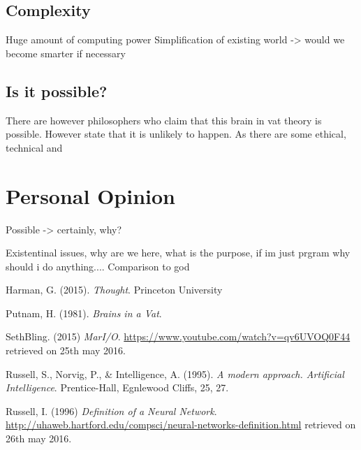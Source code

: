 \documentclass[a4paper]{article}
\begin{document}
\subsection{Complexity}
Huge amount of computing power
Simplification of existing world -> would we become smarter if necessary

\subsection{Is it possible?}
There are however philosophers who claim that this brain in vat theory is possible. However state that it is unlikely to happen. As there are some ethical, technical and 

\section{Personal Opinion}
Possible -> certainly, why?

Existentinal issues, why are we here, what is the purpose, if im just prgram why should i do anything....
Comparison to god

\begin{thebibliography}{9}

  Harman, G. (2015). \emph{Thought}. Princeton University 

  Putnam, H. (1981). \emph{Brains in a Vat}.
  
  SethBling. (2015) \emph{MarI/O}. \url{https://www.youtube.com/watch?v=qv6UVOQ0F44} retrieved on 25th may 2016.
  
Russell, S., Norvig, P., \& Intelligence, A. (1995). \emph{A modern approach. Artificial Intelligence}. Prentice-Hall, Egnlewood Cliffs, 25, 27.

Russell, I. (1996) \emph{Definition of a Neural Network}. \url{http://uhaweb.hartford.edu/compsci/neural-networks-definition.html} retrieved on 26th may 2016.

\end{thebibliography}
\end{document}
